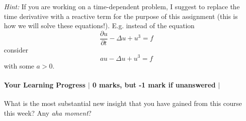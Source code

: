 \documentclass[10pt,letterpaper]{scrartcl}
\begin{document}
\emph{Hint:} If you are working on a time-dependent problem, I suggest to replace the time derivative with a reactive term for the purpose of this assignment (this is how we will solve these equations!). E.g. instead of the equation
\begin{equation*}
\frac{\partial u}{\partial t} - \Delta u  + u^3 = f
\end{equation*}
consider
\begin{equation*}
au - \Delta u  + u^3 = f
\end{equation*}
with some $a > 0$.

\paragraph*{Your Learning Progress $\vert$ 0 marks, but -1 mark if unanswered $\vert$ \faFilePdfO}

What is the most substantial new insight that you have gained from this course this week? Any \emph{aha moment}?

\vspace*{3mm}
\hrulefill

\vspace*{3mm}
\hrulefill

\vspace*{3mm}
\hrulefill
\end{document}
